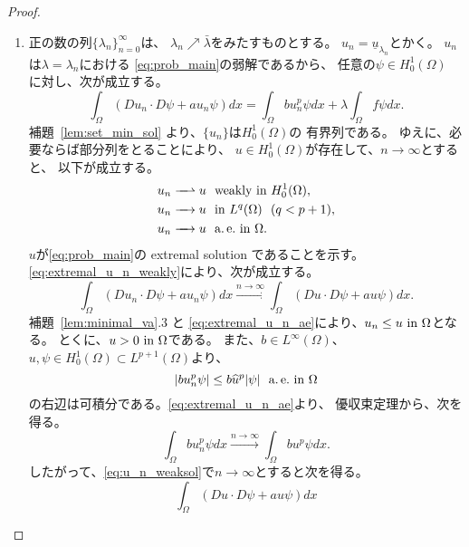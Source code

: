 \begin{proof}
 \begin{enumerate}[1.] \sage
  \item 正の数の列$\{ \lambda_n \}_{n=0}^\infty$は、
        $\lambda_n \nearrow \bar{\lambda}$をみたすものとする。
        $u_n = \underline{u}_{\lambda_n}$とかく。
        $u_n$は$\lambda = \lambda_n$における
         \ref{eq:prob_main}の弱解であるから、
        任意の$\psi \in H_0^1(\Omega)$
        に対し、次が成立する。
        \begin{equation}
         \int_\Omega (Du_n \cdot D\psi + a u_{n} \psi) dx 
          = \int_\Omega bu_n^p \psi dx + \lambda \int_\Omega f\psi dx.
          \label{eq:u_n_weaksol}
        \end{equation}
        補題~\ref{lem:set_min_sol} より、$\{ u_n \}$は$H_0^1(\Omega)$の
         有界列である。
        ゆえに、必要ならば部分列をとることにより、
        $u \in H_0^1(\Omega)$が存在して、$n \to \infty$とすると、
        以下が成立する。
        \begin{align}
         u_n \xrightharpoonup{ \mbox{ ~ } } u & \ \ \text{weakly~} \tin
         H_0^1(\Omega), \label{eq:extremal_u_n_weakly} \\
         u_n \xrightarrow{ \mbox{ ~ } } u & \ \ \tin L^q(\Omega) \ \
          (q < p+1), \notag \\
         u_n \xrightarrow{ \mbox{ ~ } } u & \ \ \ae \tin \Omega. 
         \label{eq:extremal_u_n_ae}
        \end{align}
        $u$が\ref{eq:prob_main}の extremal solution であることを示す。
        \eqref{eq:extremal_u_n_weakly}により、次が成立する。
        \[
        \int_\Omega (Du_n \cdot D\psi + a u_n \psi) dx
        \xrightarrow{n \to \infty}
        \int_\Omega (Du \cdot D\psi + a u \psi) dx.
        \]
         補題~\ref{lem:minimal_va}.3 と
        \eqref{eq:extremal_u_n_ae}により、$u_n \leq u ~\text{in}~ \Omega$となる。
         とくに、$u > 0 ~\text{in}~ \Omega$である。
        また、$b \in L^\infty(\Omega)$、
        $u, \psi \in H_0^1(\Omega) \subset L^{p+1}(\Omega)$より、
        \[
        \left\lvert bu_n^p \psi \right\rvert \leq b \widehat{u}^p
        \lvert\psi\rvert \ \ \text{a.\,e.}~
        \text{in}~ \Omega
        \]
         の右辺は可積分である。\eqref{eq:extremal_u_n_ae}より、
        優収束定理から、次を得る。
        \[
        \int_\Omega bu_n^p \psi dx \xrightarrow{n \to \infty} 
        \int_\Omega bu^p \psi dx.
        \]
        したがって、\eqref{eq:u_n_weaksol}で$n \to \infty$とすると次を得る。
        \[ 
         \int_\Omega (Du \cdot D\psi + a u \psi) dx 
\]
\end{enumerate}
\end{proof}

